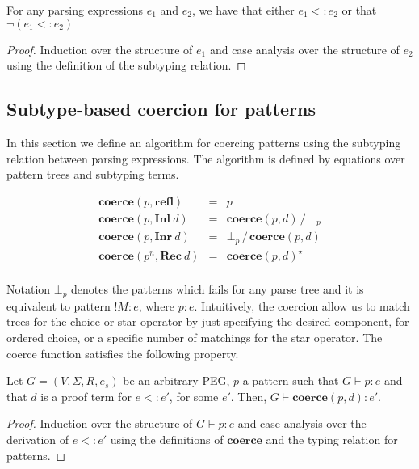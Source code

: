 \begin{theorem}
  For any parsing expressions $e_1$ and $e_2$, we have that either $e_1 <: e_2$ or
  that $\neg (e_1 <: e_2)$
\end{theorem}
\begin{proof}
  Induction over the structure of $e_1$ and case analysis over the structure of $e_2$
  using the definition of the subtyping relation.
\end{proof}


\subsection{Subtype-based coercion for patterns}

In this section we define an algorithm for coercing patterns using the subtyping
relation between parsing expressions. The algorithm is defined by equations over
pattern trees and subtyping terms.

\[
  \begin{array}{lcl}
    \mathbf{coerce}(p,\mathbf{refl}) & = & p\\
    \mathbf{coerce}(p,\mathbf{Inl}\:d) & = & \mathbf{coerce}(p,d)\,/\,\bot_p\\
    \mathbf{coerce}(p,\mathbf{Inr}\:d) & = & \bot_p\,/\,\mathbf{coerce}(p,d)\\
    \mathbf{coerce}(p^n,\mathbf{Rec}\:d) & = & \mathbf{coerce}(p,d)^\star\\
  \end{array}
\]

Notation $\bot_p$ denotes the patterns which fails for any parse tree and it is 
equivalent to pattern \(!M : e\), where \(p : e\). Intuitively, the coercion allow 
us to match trees for the choice or star operator by just specifying the desired 
component, for ordered choice, or a specific number of matchings for the star 
operator. The coerce function satisfies the following property.

\begin{theorem}\label{thm:coerce-correct}
  Let $G = (V,\Sigma, R, e_s)$ be an arbitrary PEG, $p$ a pattern such that
  $G\vdash p : e$ and that $d$ is a proof term for $e <: e'$, for some
  $e'$. Then, $G\vdash \mathbf{coerce}(p,d) : e'$.
\end{theorem}
\begin{proof}
  Induction over the structure of $G\vdash p : e$ and case analysis over
  the derivation of $e <: e'$ using the definitions of $\mathbf{coerce}$ and
  the typing relation for patterns.
\end{proof}


